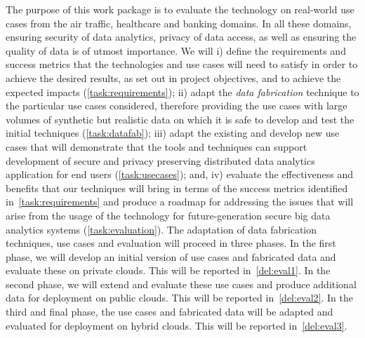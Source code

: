 \begin{Workpackage}{\thewpno}
\begin{WPDescription}
The purpose of this work package is to evaluate the \TheProject technology on real-world use cases from the air traffic, healthcare and banking domains. In all these domains, ensuring security of data analytics, privacy of data access, as well as ensuring the quality of data is of utmost importance. We will i) define the requirements and success metrics that the \TheProject{} technologies and use cases will need to satisfy in order to achieve the desired results, as set out in project objectives, and to achieve the expected impacts (\ref{task:requirements}); ii) adapt the \emph{data fabrication} technique to the particular use cases considered, therefore providing the use cases with large volumes of synthetic but realistic data on which it is safe to develop and test the initial techniques (\ref{task:datafab}); iii) adapt the existing and develop new use cases that will demonstrate that the \TheProject{} tools and techniques can support development of secure and privacy preserving distributed data analytics application for end users (\ref{task:usecases}); and, iv)  evaluate the effectiveness and benefits that our techniques will bring in terms of the success metrics identified in~\ref{task:requirements} and produce a roadmap for addressing the issues that will arise from the usage of the \TheProject{} technology for future-generation secure big data analytics systems (\ref{task:evaluation}). The adaptation of data fabrication techniques, use cases and evaluation will proceed in three phases. In the first phase, we will develop an initial version of use cases and fabricated data and evaluate these on private clouds. This will be reported in~\ref{del:eval1}. In the second phase, we will extend and evaluate these use cases and produce additional data for deployment on public clouds. This will be reported in~\ref{del:eval2}. In the third and final phase, the use cases and fabricated data will be adapted and evaluated for deployment on hybrid clouds. This will be reported in~\ref{del:eval3}.
\end{WPDescription}

\begin{Task}


\end{Task}
\end{Workpackage}
